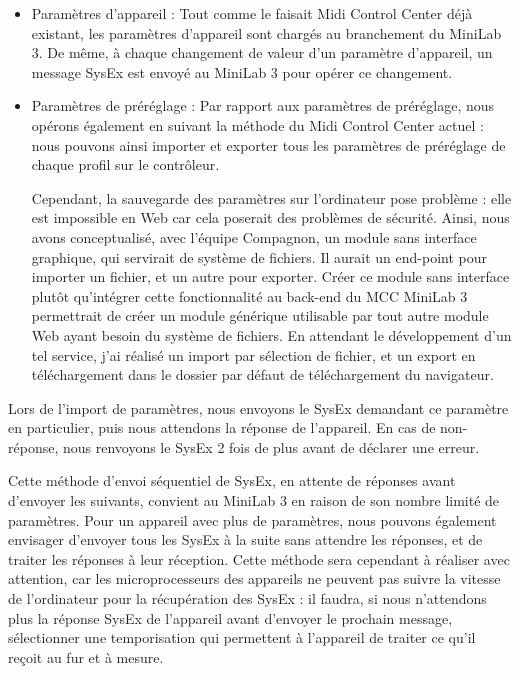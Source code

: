 \documentclass[francais]{rapportPFE}  %
\begin{document}
\begin{itemize}
    \item Paramètres d'appareil :  Tout comme le faisait Midi Control Center déjà existant, les paramètres d'appareil sont chargés au branchement du MiniLab 3. De même, à chaque changement de valeur d'un paramètre d'appareil, un message SysEx est envoyé au MiniLab 3 pour opérer ce changement.
    \item Paramètres de préréglage : Par rapport aux paramètres de préréglage, nous opérons également en suivant la méthode du Midi Control Center actuel : nous pouvons ainsi importer et exporter tous les paramètres de préréglage de chaque profil sur le contrôleur. 
    
    Cependant, la sauvegarde des paramètres sur l'ordinateur pose problème : elle est impossible en Web car cela poserait des problèmes de sécurité. Ainsi, nous avons conceptualisé, avec l'équipe Compagnon, un module sans interface graphique, qui servirait de système de fichiers. Il aurait un end-point pour importer un fichier, et un autre pour exporter. Créer ce module sans interface plutôt qu'intégrer cette fonctionnalité au back-end du MCC MiniLab 3 permettrait de créer un module générique utilisable par tout autre module Web ayant besoin du système de fichiers. En attendant le développement d'un tel service, j'ai réalisé un import par sélection de fichier, et un export en téléchargement dans le dossier par défaut de téléchargement du navigateur.
\end{itemize}

Lors de l'import de paramètres, nous envoyons le SysEx demandant ce paramètre en particulier, puis nous attendons la réponse de l'appareil. En cas de non-réponse, nous renvoyons le SysEx 2 fois de plus avant de déclarer une erreur.

Cette méthode d'envoi séquentiel de SysEx, en attente de réponses avant d'envoyer les suivants, convient au MiniLab 3 en raison de son nombre limité de paramètres. Pour un appareil avec plus de paramètres, nous pouvons également envisager d'envoyer tous les SysEx à la suite sans attendre les réponses, et de traiter les réponses à leur réception. Cette méthode sera cependant à réaliser avec attention, car les microprocesseurs des appareils ne peuvent pas suivre la vitesse de l'ordinateur pour la récupération des SysEx : il faudra, si nous n'attendons plus la réponse SysEx de l'appareil avant d'envoyer le prochain message, sélectionner une temporisation qui permettent à l'appareil de traiter ce qu'il reçoit au fur et à mesure.
\end{document}
